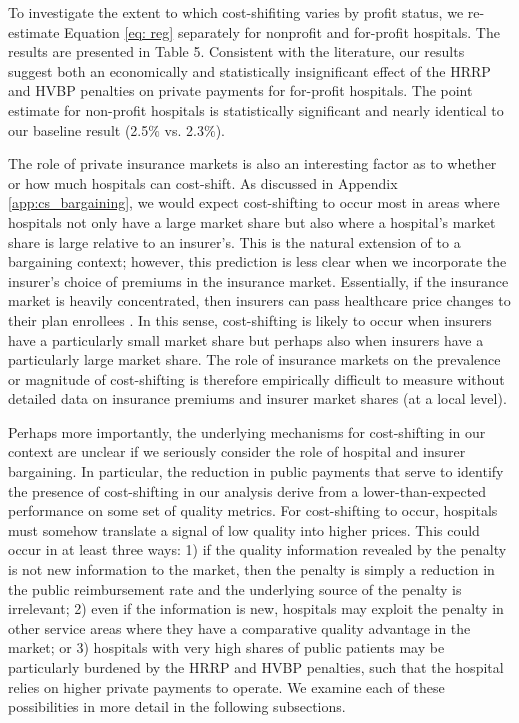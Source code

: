 \documentclass[12pt]{article}
\begin{document}
To investigate the extent to which cost-shifiting varies by profit status, we re-estimate Equation \ref{eq: reg} separately for nonprofit and for-profit hospitals.  The results are presented in Table 5.  Consistent with the literature, our results suggest both an economically and statistically insignificant effect of the HRRP and HVBP penalties on private payments for for-profit hospitals.  The point estimate for non-profit hospitals is statistically significant and nearly identical to our baseline result (2.5$\%$ vs. 2.3$\%$).

The role of private insurance markets is also an interesting factor as to whether or how much hospitals can cost-shift. As discussed in Appendix \ref{app:cs_bargaining}, we would expect cost-shifting to occur most in areas where hospitals not only have a large market share but also where a hospital's market share is large relative to an insurer's. This is the natural extension of \cite{dranove1988} to a bargaining context; however, this prediction is less clear when we incorporate the insurer's choice of premiums in the insurance market. Essentially, if the insurance market is heavily concentrated, then insurers can pass healthcare price changes to their plan enrollees \cite{ho2016}. In this sense, cost-shifting is likely to occur when insurers have a particularly small market share but perhaps also when insurers have a particularly large market share. The role of insurance markets on the prevalence or magnitude of cost-shifting is therefore empirically difficult to measure without detailed data on insurance premiums and insurer market shares (at a local level).

Perhaps more importantly, the underlying mechanisms for cost-shifting in our context are unclear if we seriously consider the role of hospital and insurer bargaining. In particular, the reduction in public payments that serve to identify the presence of cost-shifting in our analysis derive from a lower-than-expected performance on some set of quality metrics. For cost-shifting to occur, hospitals must somehow translate a signal of low quality into higher prices. This could occur in at least three ways: 1) if the quality information revealed by the penalty is not new information to the market, then the penalty is simply a reduction in the public reimbursement rate and the underlying source of the penalty is irrelevant; 2) even if the information is new, hospitals may exploit the penalty in other service areas where they have a comparative quality advantage in the market; or 3) hospitals with very high shares of public patients may be particularly burdened by the HRRP and HVBP penalties, such that the hospital relies on higher private payments to operate. We examine each of these possibilities in more detail in the following subsections.
\end{document}
